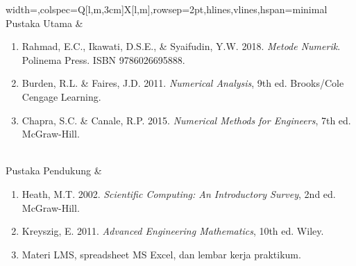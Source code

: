 \begin{longtblr}{width=\textwidth,colspec={Q[l,m,3cm]X[l,m]},rowsep=2pt,hlines,vlines,hspan=minimal}
Pustaka Utama & \begin{enumerate}\item Rahmad, E.C., Ikawati, D.S.E., \& Syaifudin, Y.W. 2018. \textit{Metode Numerik}. Polinema Press. ISBN 9786026695888.\item Burden, R.L. \& Faires, J.D. 2011. \textit{Numerical Analysis}, 9th ed. Brooks/Cole Cengage Learning.\item Chapra, S.C. \& Canale, R.P. 2015. \textit{Numerical Methods for Engineers}, 7th ed. McGraw-Hill.\end{enumerate} \\
Pustaka Pendukung & \begin{enumerate}\item Heath, M.T. 2002. \textit{Scientific Computing: An Introductory Survey}, 2nd ed. McGraw-Hill.\item Kreyszig, E. 2011. \textit{Advanced Engineering Mathematics}, 10th ed. Wiley.\item Materi LMS, spreadsheet MS Excel, dan lembar kerja praktikum.\end{enumerate} \\
\end{longtblr}

